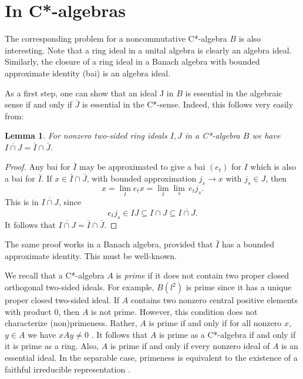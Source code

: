 \documentclass[11pt,leqno]{amsart}
\newtheorem{lemma}[theorem]{Lemma}
\theoremstyle{definition}
\theoremstyle{remark}
\numberwithin{equation}{section}
\numberwithin{equation}{section}
\begin{document}
\section{In C*-algebras}

The corresponding problem for a noncommutative 
 C*-algebra $B$ is also interesting. 
 Note that a ring ideal  in a unital algebra is clearly an algebra ideal.   Similarly, the closure of a ring ideal  in a Banach algebra with bounded approximate identity (bai) is an algebra ideal. 

As a first step, one can show that an ideal J in $B$ is essential in the algebraic sense if and only if $\bar{J}$ is essential in the C*-sense.  Indeed, this follows very easily from:

\begin{lemma} \label{l2i} For nonzero two-sided  ring ideals $I, J$ in a  C*-algebra $B$ we have $\overline{I \cap J} = \bar{I} \cap \bar{J}$.
\end{lemma}
	
\begin{proof} Any  bai for $\bar{I}$ may be approximated to give a  bai $(e_t)$ for $I$ which is also a
 bai for $\bar{I}$.  If $x \in \bar{I} \cap \bar{J}$, with bounded 
approximation $j_s \to x$ with 
$j_s \in J$, then $$x = \lim_t e_t x = \lim_t \lim_s \, e_t j_s.$$ This
is in $\overline{I \cap J}$, since
$$e_t j_s \in I J \subseteq I \cap J \subseteq \overline{I \cap J}.$$
It follows that $\overline{I \cap J} = \bar{I} \cap \bar{J}$.
\end{proof} 

The same proof works in a Banach algebra, provided that 
$\bar{I}$ has a bounded approximate identity.  This must be well-known.        

We recall that a C*-algebra $A$ is {\em prime} if it does not contain two proper closed orthogonal two-sided ideals.
For example, $B(l^2)$ is prime since it has a unique 
proper closed two-sided ideal.   If $A$ contains two nonzero central positive elements with product 0, then $A$  is not prime.  However, this condition does not characterize (non)primeness.  Rather, $A$ is prime if and only if for all nonzero $x$, $y \in A$ we have $xAy \neq 0$ \cite[Proposition II.5.4.5]{Bla06}. It follows that  $A$ is prime as a C*-algebra if and only if it is prime as a ring. Also, $A$ is prime if and only if every nonzero ideal of $A$ is an essential ideal.  In the separable case, primeness is equivalent to the existence of a faithful irreducible representation \cite{Bla06}.  
\end{document}
